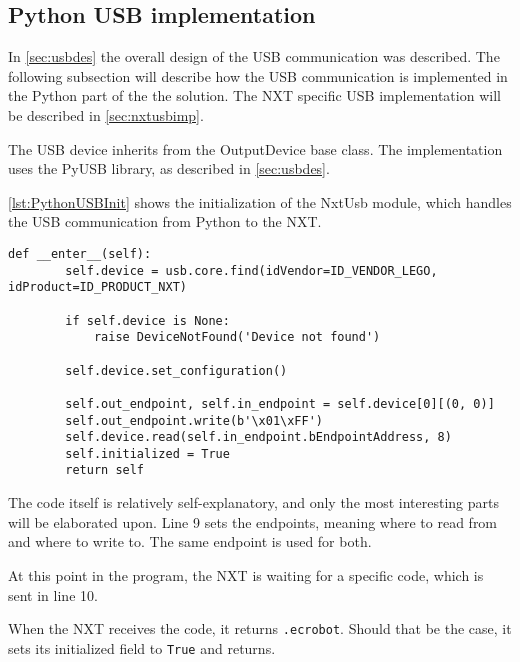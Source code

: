 \subsection{Python USB implementation}\label{sol:subsec:pythonusb}
In \autoref{sec:usbdes} the overall design of the USB communication was described.
The following subsection will describe how the USB communication is implemented in the Python part of the the solution.
The NXT specific USB implementation will be described in \autoref{sec:nxtusbimp}.

The USB device inherits from the OutputDevice base class.
The implementation uses the PyUSB library, as described in \autoref{sec:usbdes}\cite{PyUSB}.

\autoref{lst:PythonUSBInit} shows the initialization of the NxtUsb module, which handles the USB communication from Python to the NXT.
\begin{lstlisting}[label={lst:PythonUSBInit},caption={The initialization of PyUSB{.} Comments removed}]
    def __enter__(self):
        self.device = usb.core.find(idVendor=ID_VENDOR_LEGO, idProduct=ID_PRODUCT_NXT)

        if self.device is None:
            raise DeviceNotFound('Device not found')

        self.device.set_configuration()

        self.out_endpoint, self.in_endpoint = self.device[0][(0, 0)]
        self.out_endpoint.write(b'\x01\xFF')
        self.device.read(self.in_endpoint.bEndpointAddress, 8)
        self.initialized = True
        return self
\end{lstlisting}

The code itself is relatively self-explanatory, and only the most interesting parts will be elaborated upon.
Line 9 sets the endpoints, meaning where to read from and where to write to.
The same endpoint is used for both.

At this point in the program, the NXT is waiting for a specific code, which is sent in line 10.

When the NXT receives the code, it returns \texttt{{.}ecrobot}.
Should that be the case, it sets its initialized field to \texttt{True} and returns.




